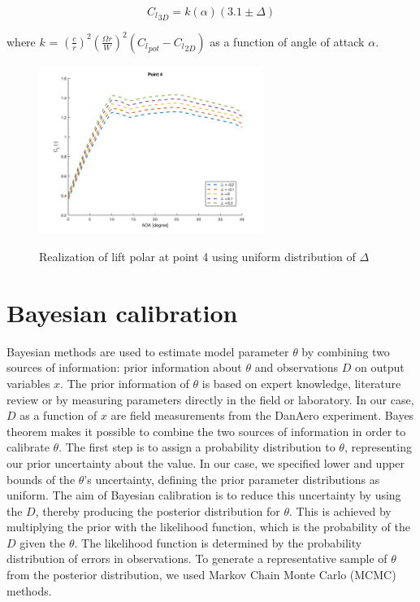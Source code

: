 \documentclass[11pt]{article}
\begin{document}
\begin{equation}
    {{}{C}_l}_{3D} = k(\alpha)(3.1 \pm \Delta)
    \label{eq3}
\end{equation}

\noindent where $k$ = $(\frac{c}{r})^2(\frac{\Omega r}{W})^2({{}{C}_l}_{pot} - {{}{C}_l}_{2D})$ as a function of angle of attack $\alpha$. 

\begin{figure}
\centering
\includegraphics[width=0.65\textwidth]{ snel.png}
\label{pt1}
\caption{Realization of lift polar at point 4 using uniform distribution of $\Delta$}
\end{figure}




\section{Bayesian calibration}

Bayesian methods are used to estimate model parameter $\theta$  by combining two sources of information: prior information about $\theta$ and observations $D$ on output variables $x$. The prior information of $\theta$ is based on expert knowledge, literature review or by measuring parameters directly in the field or laboratory. In our case, $D$  as a function of $x$ are field measurements from the DanAero experiment. Bayes theorem makes it possible to combine the two
sources of information in order to calibrate $\theta$. The first step is to assign a probability distribution to $\theta$, representing our prior uncertainty about the value. In our case, we specified lower and upper bounds of the $\theta$'s uncertainty, defining the prior parameter distributions as uniform. The aim of Bayesian calibration is to reduce this uncertainty by using the $D$, thereby producing the posterior distribution for $\theta$. This is achieved by multiplying the prior with the likelihood function, which is the
probability of the $D$ given the $\theta$. The likelihood function is determined by the probability distribution of errors in
observations. To generate a representative sample of $\theta$ from the posterior distribution, we used  Markov Chain Monte Carlo (MCMC) methods.
\end{document}
